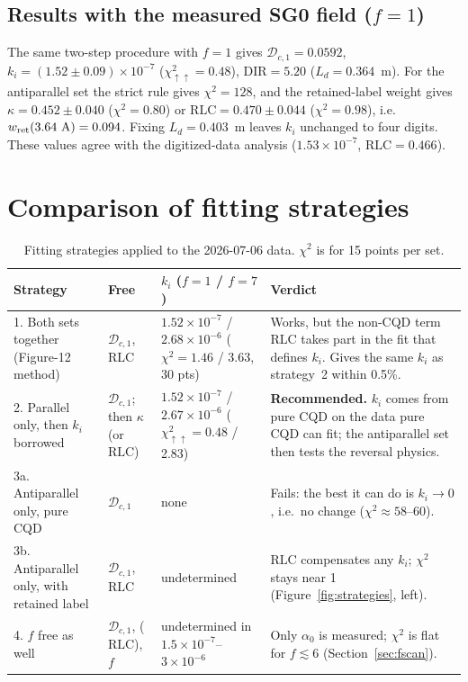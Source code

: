 \documentclass[11pt,a4paper]{article}
\newcommand{\D}{\mathcal{D}}
\newcommand{\pp}{{\uparrow\uparrow}}
\newcommand{\DIR}{\mathrm{DIR}}
\newcommand{\RLC}{\mathrm{RLC}}
\begin{document}
\subsection{Results with the measured SG0 field (\texorpdfstring{$f=1$}{f=1})}
The same two-step procedure with $f=1$ gives $\D_{c,1}=0.0592$, $k_i=(1.52\pm0.09)\times10^{-7}$
($\chi^2_\pp=0.48$), $\DIR=5.20$ ($L_d=0.364$~m). For the antiparallel set the strict rule gives
$\chi^2=128$, and the retained-label weight gives $\kappa=0.452\pm0.040$ ($\chi^2=0.80$) or
$\RLC=0.470\pm0.044$ ($\chi^2=0.98$), i.e.\ $w_{\rm ret}(3.64~\text{A})=0.094$. Fixing $L_d=0.403$~m
leaves $k_i$ unchanged to four digits. These values agree with the digitized-data analysis
($1.53\times10^{-7}$, $\RLC=0.466$).

\section{Comparison of fitting strategies}
\label{sec:strategies}

\begin{table}[h]
\centering
\caption{Fitting strategies applied to the 2026-07-06 data. $\chi^2$ is for 15 points per set.}
\label{tab:strategies}
\footnotesize\setlength{\tabcolsep}{4pt}
\begin{tabular}{p{3.5cm}p{2.0cm}p{3.6cm}p{5.2cm}}
\toprule
Strategy & Free & $k_i$ ($f=1$ / $f=7$) & Verdict\\
\midrule
1. Both sets together (Figure-12 method) & $\D_{c,1}$, $\RLC$ & $1.52\times10^{-7}$ / $2.68\times10^{-6}$ ($\chi^2=1.46$ / 3.63, 30 pts) &
Works, but the non-CQD term $\RLC$ takes part in the fit that defines $k_i$. Gives the same $k_i$ as
strategy~2 within 0.5\%.\\[3pt]
2. Parallel only, then $k_i$ borrowed & $\D_{c,1}$; then $\kappa$ (or $\RLC$) & $1.52\times10^{-7}$ / $2.67\times10^{-6}$ ($\chi^2_\pp=0.48$ / 2.83) &
\textbf{Recommended.} $k_i$ comes from pure CQD on the data pure CQD can fit; the antiparallel set
then tests the reversal physics.\\[3pt]
3a. Antiparallel only, pure CQD & $\D_{c,1}$ & none &
Fails: the best it can do is $k_i\to0$, i.e.\ no change ($\chi^2\approx58$--60).\\[3pt]
3b. Antiparallel only, with retained label & $\D_{c,1}$, $\RLC$ & undetermined &
$\RLC$ compensates any $k_i$; $\chi^2$ stays near 1 (Figure~\ref{fig:strategies}, left).\\[3pt]
4. $f$ free as well & $\D_{c,1}$, ($\RLC$), $f$ & undetermined in $1.5\times10^{-7}$--$3\times10^{-6}$ &
Only $\alpha_0$ is measured; $\chi^2$ is flat for $f\lesssim6$ (Section~\ref{sec:fscan}).\\
\bottomrule
\end{tabular}
\end{table}
\end{document}
